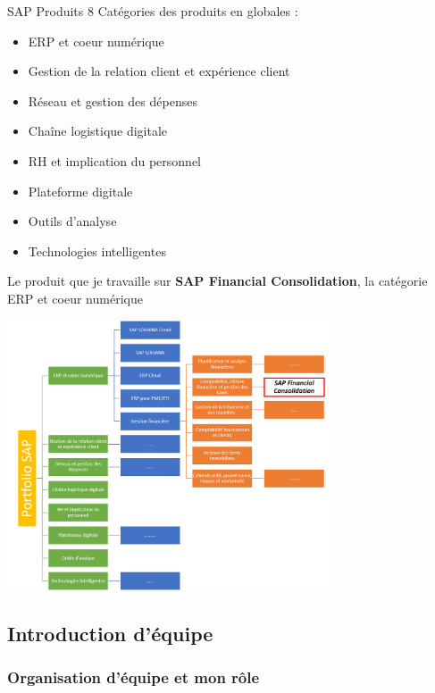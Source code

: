 \documentclass{beamer}
\begin{document}
        \begin{frame}
            \begin{block}{SAP Produits}
                8 Catégories des produits en globales : 
                \begin{itemize}
                    \item ERP et coeur numérique
                    \item Gestion de la relation client et expérience client
                    \item Réseau et gestion des dépenses
                    \item Chaîne logistique digitale
                    \item RH et implication du personnel
                    \item Plateforme digitale
                    \item Outils d’analyse
                    \item Technologies intelligentes
                \end{itemize}
            \end{block}
            \pause
            \begin{block}{Le produit que je travaille sur}
            \textbf{SAP Financial Consolidation}, la catégorie ERP et coeur numérique
            \end{block}
        \end{frame}
        
        \begin{frame}
            \includegraphics[height=8cm]{SAP_portfolio.png}
        \end{frame}
        
        \subsection{Introduction d'équipe}
        \begin{frame}
        \frametitle{Organisation d'équipe et mon rôle}
            
        \end{frame}
        
\end{document}
